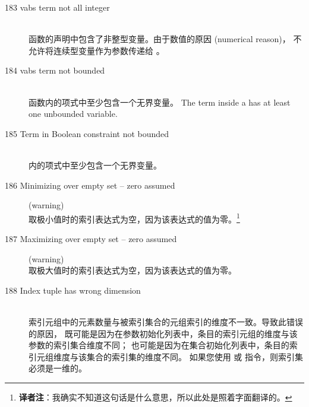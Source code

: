 \begin{description}
\item[183 vabs term not all integer]\ \\
   函数的声明中包含了非整型变量。由于数值的原因 (numerical reason)，
  不允许将连续型变量作为参数传递给 。
\item[184 vabs term not bounded]\ \\
   函数内的项式中至少包含一个无界变量。
   The term inside a  has at least one unbounded variable.
\item[185 Term in Boolean constraint not bounded]\ \\
   内的项式中至少包含一个无界变量。
%
%
\item[186 Minimizing over empty set -- zero assumed] (warning)\ \\
  取极小值时的索引表达式为空，因为该表达式的值为零。\footnote{
    \textbf{译者注}：我确实不知道这句话是什么意思，所以此处是照着字面翻译的。}
\item[187 Maximizing over empty set -- zero assumed] (warning)\ \\
  取极大值时的索引表达式为空，因为该表达式的值为零。
\item[188 Index tuple has wrong dimension]\ \\
  索引元组中的元素数量与被索引集合的元组索引的维度不一致。导致此错误的原因，
  既可能是因为在参数初始化列表中，条目的索引元组的维度与该参数的索引集合维度不同；
  也可能是因为在集合初始化列表中，条目的索引元组维度与该集合的索引集的维度不同。
  如果您使用  或  指令，则索引集必须是一维的。

\end{description}
